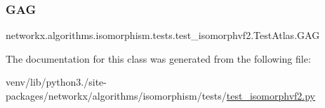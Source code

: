 \subsubsection{\texorpdfstring{G\+AG}{GAG}}
{\footnotesize\ttfamily networkx.\+algorithms.\+isomorphism.\+tests.\+test\+\_\+isomorphvf2.\+Test\+Atlas.\+G\+AG}



The documentation for this class was generated from the following file\+:\begin{DoxyCompactItemize}
\item 
venv/lib/python3./site-\/packages/networkx/algorithms/isomorphism/tests/\hyperlink{test__isomorphvf2_8py}{test\+\_\+isomorphvf2.\+py}\end{DoxyCompactItemize}
